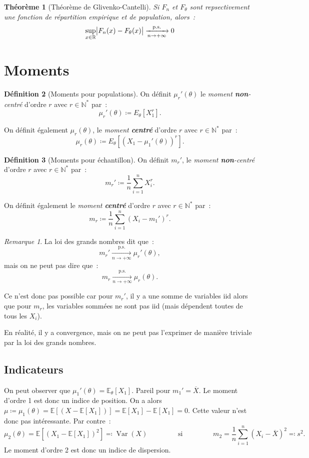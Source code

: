 \documentclass{report}
\DeclareMathOperator{\Var}{Var}
\newcommand{\E}{\mathbb E}
\newcommand{\pinfty}{{+\infty}}
\newcommand{\ps}{{\text{p.s.}}}
\newcommand{\cvgps}{\xrightarrow[n \to \pinfty]\ps}
\newcommand{\N}{\mathbb N}
\newcommand{\Ns}{\N^{*}}
\newcommand{\R}{\mathbb R}
\newtheorem{thm}{Théorème}[chapter]
\theoremstyle{definition}
\newtheorem{déf}[thm]{Définition}
\theoremstyle{remark}
\newtheorem*{rmq}{Remarque}
\begin{document}
		\begin{thm}[Théorème de Glivenko-Cantelli] Si $F_n$ et $F_\theta$ sont repsectivement une fonction de répartition empirique et de population, alors~:
		\[\sup_{x \in \R}\abs {F_n(x) - F_\theta(x)} \cvgps 0\]
		\end{thm}

	\section{Moments}
		\begin{déf}[Moments pour populations] On définit $\mu_r'(\theta)$ le \textit{moment \textbf{non}-centré} d'ordre $r$ avec $r \in \Ns$ par~:
		\[\mu_r'(\theta) \coloneqq E_\theta[X_1^r].\]

		On définit également $\mu_r(\theta)$, le \textit{moment \textbf{centré}} d'ordre $r$ avec $r \in \Ns$ par~:
		\[\mu_r(\theta) \coloneqq E_\theta\left[\left(X_1 - \mu_1'(\theta)\right)^r\right].\]
		\end{déf}

		\begin{déf}[Moments pour échantillon] On définit $m_r'$, le \textit{moment \textbf{non}-centré} d'ordre $r$ avec $r \in \Ns$ par~:
		\[m_r' \coloneqq \frac 1n\sum_{i=1}^n X_i^r.\]

		On définit également le \textit{moment \textbf{centré}} d'ordre $r$ avec $r \in \Ns$ par~:
		\[m_r \coloneqq \frac 1n\sum_{i=1}^n\left(X_i - m_1'\right)^r.\]
		\end{déf}

		\begin{rmq} La loi des grands nombres dit que~:
		\[m_r' \cvgps \mu_r'(\theta),\]
		mais on ne peut pas dire que~:
		\[m_r \cvgps \mu_r(\theta).\]

		Ce n'est donc pas possible car pour $m_r'$, il y a une somme de variables iid alors que pour $m_r$, les variables sommées ne sont pas iid (mais
		dépendent toutes de tous les $X_i$).

		En réalité, il y a convergence, mais on ne peut pas l'exprimer de manière triviale par la loi des grands nombres. \end{rmq}

		\subsection{Indicateurs}
			On peut observer que $\mu_1'(\theta) = \E_\theta[X_1]$. Pareil pour $m_1' = \overline X$. Le moment d'ordre 1 est donc un indice de position.
			On a alors $\mu \coloneqq \mu_1(\theta) = \E[(X - \E[X_1])] = \E[X_1] - \E[X_1] = 0$. Cette valeur n'est donc pas intéressante. Par contre~:
			\[\mu_2(\theta) = \E\left[(X_1 - \E[X_1])^2\right] \eqqcolon \Var(X) \qquad\qquad \text{ si }
				\qquad\qquad m_2 = \frac 1n\sum_{i=1}^n\left(X_i - \overline X\right)^2 \eqqcolon s^2.\]
			Le moment d'ordre 2 est donc un indice de dispersion.
\end{document}
